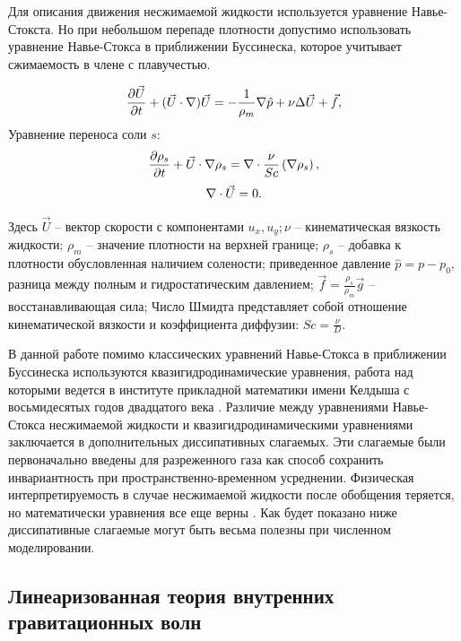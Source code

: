 Для описания движения несжимаемой жидкости используется уравнение Навье-Стокста. Но при небольшом перепаде плотности допустимо использовать уравнение Навье-Стокса в приближении Буссинеска, которое учитывает сжимаемость в члене с плавучестью.

\begin{equation}
 \large \frac{\partial \vec U}{\partial t} + (\vec U \cdot \nabla) \vec U = - \frac{1}{\rho_m} \nabla \hat p + \nu \Delta \vec U  + \vec f,
 \label{eq:momClassic}
\end{equation}
Уравнение переноса соли $s$:
\begin{equation}
 \large \frac{\partial \rho_s}{\partial t} + \vec U \cdot \nabla \rho_s  = \nabla \cdot \frac{\nu}{Sc} \left ( \nabla \rho_s \right ),
 \label{eq:transClassic}
\end{equation}
\begin{equation}
 \large \nabla \cdot \vec U  = 0.
 \label{eq:contClassic}
\end{equation}

Здесь $\vec{U}$ -- вектор скорости с компонентами $u_x,u_y; \nu$ -- кинематическая вязкость жидкости; $\rho_m$ -- значение плотности на верхней границе; $\rho_s$ -- добавка к плотности обусловленная наличием солености; приведенное давление $\hat{p}=p-p_0$, разница между полным и гидростатическим давлением; $\vec{f}=\frac{\rho_s}{\rho_m} \vec{g}$ -- восстанавливающая сила; Число Шмидта представляет собой отношение кинематической вязкости и коэффициента диффузии:  $Sc = \frac{\nu}{D}$. 

В данной работе помимо классических уравнений Навье-Стокса в приближении Буссинеска используются квазигидродинамические уравнения, работа над которыми ведется в институте прикладной математики имени Келдыша с восьмидесятых годов двадцатого века \cite{bookELIZ}. Различие между уравнениями Навье-Стокса несжимаемой жидкости и квазигидродинамическими уравнениями заключается в дополнительных диссипативных слагаемых. Эти слагаемые были первоначально введены для разреженного газа как способ сохранить инвариантность при пространственно-временном усреднении\cite{AIAAJ1995}. Физическая интерпретируемость в случае несжимаемой жидкости после обобщения теряется, но математически уравнения все еще верны \cite{Elizarova2011}. Как будет показано ниже диссипативные слагаемые могут быть весьма полезны при численном моделировании. 

\subsection{Линеаризованная теория внутренних гравитационных волн}

